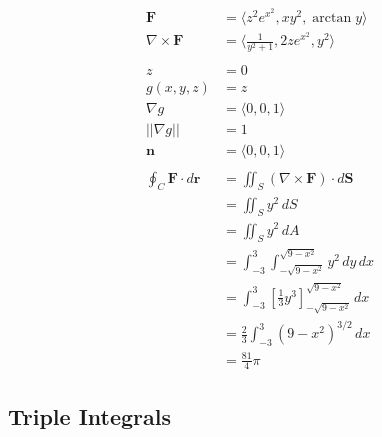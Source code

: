 \documentclass{article}
\begin{document}
\begin{align*}
  \mathbf{F}                            & = \langle z^2 e^{x^2}, x y^2, \arctan y \rangle                                      \\
  \nabla \times \mathbf{F}              & = \langle \frac{1}{y^2 + 1}, 2 z e^{x^2}, y^2 \rangle                                \\ \\
  z                                     & = 0                                                                                  \\
  g(x, y, z)                            & = z                                                                                  \\
  \nabla g                              & = \langle 0, 0, 1 \rangle                                                            \\
  ||\nabla g||                          & = 1                                                                                  \\
  \mathbf{n}                            & = \langle 0, 0, 1 \rangle                                                            \\ \\
  \oint_C \mathbf{F} \cdot d \mathbf{r} & = \iint_S (\nabla \times \mathbf{F}) \cdot d \mathbf{S}                              \\
                                        & = \iint_S y^2 \,dS                                                                   \\
                                        & = \iint_S y^2 \,dA                                                                   \\
                                        & = \int_{-3}^3 \int_{-\sqrt{9 - x^2}}^{\sqrt{9 - x^2}} y^2 \,dy \,dx                  \\
                                        & = \int_{-3}^3 \left[ \frac{1}{3} y^3 \right]_{-\sqrt{9 - x^2}}^{\sqrt{9 - x^2}} \,dx \\
                                        & = \frac{2}{3} \int_{-3}^3 (9 - x^2)^{3 / 2} \,dx                                     \\
                                        & = \frac{81}{4} \pi
\end{align*}

\subsection{Triple Integrals}
\end{document}
